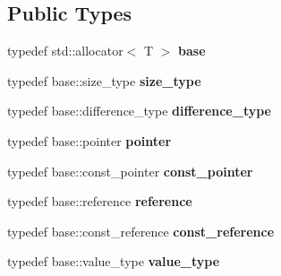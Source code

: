 \subsection*{Public Types}
\begin{DoxyCompactItemize}
\item 
\mbox{\label{structsecure__allocator_aecbe486abe3e32e35e3289e149bd2356}} 
typedef std\+::allocator$<$ T $>$ {\bfseries base}
\item 
\mbox{\label{structsecure__allocator_aa9db67804b069d61983213bded98c08f}} 
typedef base\+::size\+\_\+type {\bfseries size\+\_\+type}
\item 
\mbox{\label{structsecure__allocator_a6ced0c166194ce9a266df10018cbb862}} 
typedef base\+::difference\+\_\+type {\bfseries difference\+\_\+type}
\item 
\mbox{\label{structsecure__allocator_a71b267e8d1667eacf8c3505cce785aea}} 
typedef base\+::pointer {\bfseries pointer}
\item 
\mbox{\label{structsecure__allocator_abf76dd1c45de47c15d7a8c53cb2d8ab9}} 
typedef base\+::const\+\_\+pointer {\bfseries const\+\_\+pointer}
\item 
\mbox{\label{structsecure__allocator_a6d85bb5fed183fb2304b8403a8843eb4}} 
typedef base\+::reference {\bfseries reference}
\item 
\mbox{\label{structsecure__allocator_a5ec58945b7a8010f7e8a77ebfd96ae8e}} 
typedef base\+::const\+\_\+reference {\bfseries const\+\_\+reference}
\item 
\mbox{\label{structsecure__allocator_a344198c1316ccf0a1b58ce9c0de7c012}} 
typedef base\+::value\+\_\+type {\bfseries value\+\_\+type}
\end{DoxyCompactItemize}

